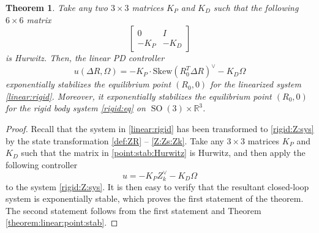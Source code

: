 \documentclass[letterpaper, 10 pt, conference]{ieeeconf}  %
\newtheorem{theorem}{Theorem}[section]
\newcommand{\Skew}{\mathrm{Skew}}
\newcommand{\SO}{\operatorname{SO}(3)}
\begin{document}
\begin{theorem}\label{theorem:linear:rigid:stab}
Take any two $3\times 3$ matrices $K_P$ and $K_D$ such that the following $6\times 6$ matrix 
\begin{equation}\label{point:stab:Hurwitz}
\begin{bmatrix}
0 & I \\
-K_P & -K_D
\end{bmatrix}
\end{equation}
is Hurwitz. Then, the linear PD controller
\begin{equation}\label{linear:control:rigid}
u(\Delta R,\Omega) = -K_P  \cdot \Skew (R_0^T\Delta R)^\vee - K_D\Omega
\end{equation}
 exponentially stabilizes the equilibrium point $(R_0,0)$ for the linearized system  \eqref{linear:rigid}. Moreover, it exponentially stabilizes the equilibrium point $(R_0,0)$ for the rigid body system \eqref{rigid:eq} on $\SO \times \mathbb R^3$.
\end{theorem}

\begin{proof}
Recall that the system in \eqref{linear:rigid} has been transformed to \eqref{rigid:Z:sys} by the state transformation \eqref{def:ZR} -- \eqref{Z:Zs:Zk}.
Take any $3\times 3$ matrices $K_P$ and $K_D$ such that the matrix in \eqref{point:stab:Hurwitz} is Hurwitz, and then apply  the following controller
\[
u = -K_P Z_k^\vee - K_D \Omega
\]
to the system \eqref{rigid:Z:sys}.
It is then easy to verify that the resultant closed-loop system is exponentially stable, which proves the first statement of the theorem. The second statement follows from the first statement and Theorem \ref{theorem:linear:point:stab}.  
\end{proof}
\end{document}
